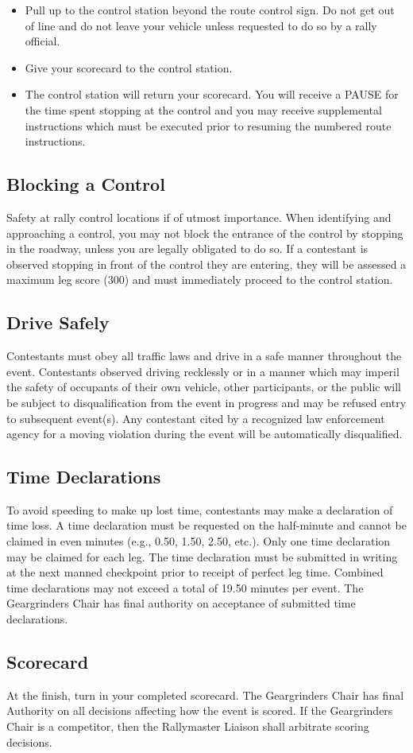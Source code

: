 \begin{itemize}

\item Pull up to the control station beyond the route control sign. Do not get out of line and do not leave your vehicle unless requested to do so by a rally official.

\item Give your scorecard to the control station.

\item The control station will return your scorecard. You will receive a PAUSE for the time spent stopping at the control and you may receive supplemental instructions which must be executed prior to resuming the numbered route instructions.

\end{itemize}

\subsection{Blocking a Control}
Safety at rally control locations if of utmost importance. When identifying and approaching a control, you may not block the entrance of the control by stopping in the roadway, unless you are legally obligated to do so. If a contestant is observed stopping in front of the control they are entering, they will be assessed a maximum leg score (300) and must immediately proceed to the control station.

\subsection{Drive Safely}
Contestants must obey all traffic laws and drive in a safe manner throughout the event. Contestants observed driving recklessly or in a manner which may imperil the safety of occupants of their own vehicle, other participants, or the public will be subject to disqualification from the event in progress and may be refused entry to subsequent event(s). Any contestant cited by a recognized law enforcement agency for a moving violation during the event will be automatically disqualified.

\subsection{Time Declarations}
To avoid speeding to make up lost time, contestants may make a declaration of time loss. A time declaration must be requested on the half-minute and cannot be claimed in even minutes (e.g., 0.50, 1.50, 2.50, etc.). Only one time declaration may be claimed for each leg. The time declaration must be submitted in writing at the next manned checkpoint prior to receipt of perfect leg time. Combined time declarations may not exceed a total of 19.50 minutes per event. The Geargrinders Chair has final authority on acceptance of submitted time declarations.

\subsection{Scorecard}
At the finish, turn in your completed scorecard. The Geargrinders Chair has final Authority on all decisions affecting how the event is scored. If the Geargrinders Chair is a competitor, then the Rallymaster Liaison shall arbitrate scoring decisions.